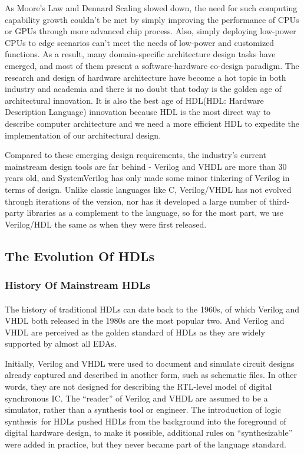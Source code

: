 \documentclass{article}
\begin{document}
As Moore's Law and Dennard Scaling slowed down, the need for such computing capability growth couldn't be met by simply improving the performance of CPUs or GPUs through more advanced chip process. Also, simply deploying low-power CPUs to edge scenarios can’t meet the needs of low-power and customized functions. As a result, many domain-specific architecture design tasks have emerged, and most of them present a software-hardware co-design paradigm.
The research and design of hardware architecture have become a hot topic in both industry and academia and there is no doubt that today is the golden age of architectural innovation. It is also the best age of HDL(HDL: Hardware Description Language) innovation because HDL is the most direct way to describe computer architecture and we need a more efficient HDL to expedite the implementation of our architectural design.
 
Compared to these emerging design requirements, the industry's current mainstream design tools are far behind - Verilog and VHDL are more than 30 years old, and SystemVerilog has only made some minor tinkering of Verilog in terms of design. Unlike classic languages like C, Verilog/VHDL has not evolved through iterations of the version, nor has it developed a large number of third-party libraries as a complement to the language, so for the most part, we use Verilog/HDL the same as when they were first released.
 
\subsection{The Evolution Of HDLs}

\subsubsection{History Of Mainstream HDLs}
\paragraph{}

The history of traditional HDLs can date back to the 1960s, of which Verilog and VHDL both released in the 1980s are the most popular two. And Verilog and VHDL are perceived as the golden standard of HDLs as they are widely supported by almost all EDAs.

Initially, Verilog and VHDL were used to document and simulate circuit designs already captured and described in another form, such as schematic files. In other words, they are not designed for describing the RTL-level model of digital synchronous IC. The “reader” of Verilog and VHDL are assumed to be a simulator, rather than a synthesis tool or engineer. The introduction of logic synthesis for HDLs pushed HDLs from the background into the foreground of digital hardware design, to make it possible, additional rules on “synthesizable” were added in practice, but they never became part of the language standard.
\end{document}
